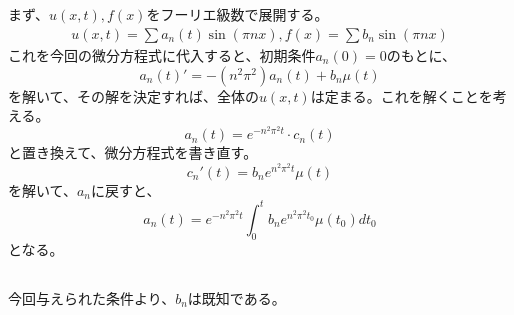 \documentclass{jarticle}
\begin{document}
\subsection{}
まず、$u(x,t),f(x)$をフーリエ級数で展開する。
\begin{eqnarray}
u(x,t)=\sum a_n(t)\sin(\pi nx),f(x)=\sum b_n \sin(\pi nx)
\end{eqnarray}
これを今回の微分方程式に代入すると、初期条件$a_n(0) = 0$のもとに、
\begin{equation}
a_n(t)'=-(n^2\pi^2)a_n(t) + b_n \mu(t)
\end{equation}
を解いて、その解を決定すれば、全体の$u(x,t)$は定まる。これを解くことを考える。
\begin{equation}
a_n(t) = e^{-n^2 \pi^2 t}\cdot c_n(t)
\end{equation}
と置き換えて、微分方程式を書き直す。
\begin{equation}
c_n'(t) = b_ne^{n^2 \pi^2 t} \mu(t)
\end{equation}
を解いて、$a_n$に戻すと、
\begin{equation}
a_n(t) = e^{-n^2\pi^2 t}\int_0^t b_n e^{n^2\pi^2 t_0}\mu(t_0) dt_0
\end{equation}
となる。

\subsection{}
今回与えられた条件より、$b_n$は既知である。
\end{document}
